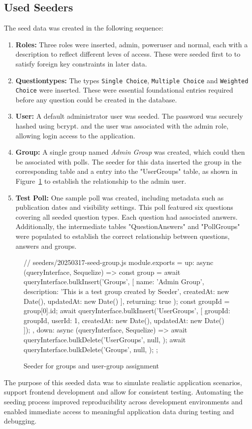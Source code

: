 \documentclass[a4paper,12pt]{report}
\begin{document}
\subsection{Used Seeders}
The seed data was created in the following sequence:
\begin{enumerate}
	\item \textbf{Roles:} Three roles were inserted, admin, poweruser and normal, each with a description to reflect different leves of access. These were seeded first to to satisfy foreign key constraints in later data.
	\item \textbf{Questiontypes:} The types \texttt{Single Choice}, \texttt{Multiple Choice} and \texttt{Weighted Choice} were inserted. These were essential foundational entries required before any question could be created in the database. 
	\item \textbf{User:} A default administrator user was seeded. The password was securely hashed using bcrypt. and the user was associated with the admin role, allowing login access to the application.
	\item \textbf{Group:} A single group named \textit{Admin Group} was created, which could then be associated with polls. The seeder for this data inserted the group in the corresponding table and a entry into the "UserGroups" table, as shown in Figure~\ref{fig:group_seeder} to establish the relationship to the admin user.
	\item \textbf{Test Poll:} One sample poll was created, including metadata such as publication dates and visibility settings. This poll featured six questions covering all seeded question types. Each question had associated answers. Additionally, the intermediate tables "QuestionAnswers" and "PollGroups" were populated to establish the correct relationship between questions, answers and groups.
\end{enumerate}
\begin{figure}[H]
	\begin{code}
	// seeders/20250317-seed-group.js
	module.exports = {
	up: async (queryInterface, Sequelize) => {
		const group = await queryInterface.bulkInsert('Groups', [{
		name: 'Admin Group',
		description: 'This is a test group created by Seeder',
		createdAt: new Date(),
		updatedAt: new Date()
		}], { returning: true });
		const groupId = group[0].id;
		await queryInterface.bulkInsert('UserGroups', [{
		groupId: groupId,
		userId: 1,
		createdAt: new Date(),
		updatedAt: new Date()
		}]);
	},
	down: async (queryInterface, Sequelize) => {
		await queryInterface.bulkDelete('UserGroups', null, {});
		await queryInterface.bulkDelete('Groups', null, {});
	}
	};
	\end{code}
\caption{Seeder for groups and user-group assignment}
\label{fig:group_seeder}
\end{figure}
The purpose of this seeded data was to simulate realistic application scenarios, support frontend development and allow for consistent testing. Automating the seeding process improved reproducibility across development environments and enabled immediate access to meaningful application data during testing and debugging. \\ \\
\end{document}
